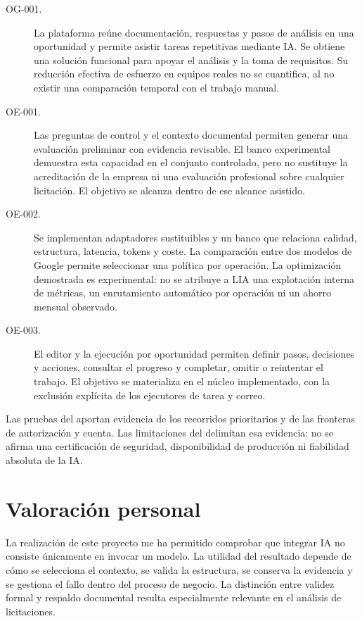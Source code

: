 \begin{description}
  \item[OG-001.] La plataforma reúne documentación, respuestas y
    pasos de análisis en una oportunidad y permite asistir tareas repetitivas
    mediante IA. Se obtiene una solución funcional para apoyar el análisis y la
    toma de requisitos. Su reducción efectiva de esfuerzo en equipos reales no
    se cuantifica, al no existir una comparación temporal con el trabajo manual.

  \item[OE-001.] Las preguntas de control y el contexto
    documental permiten generar una evaluación preliminar con evidencia
    revisable. El banco experimental demuestra esta capacidad en el conjunto
    controlado, pero no sustituye la acreditación de la empresa ni una evaluación
    profesional sobre cualquier licitación. El objetivo se alcanza dentro de ese
    alcance asistido.

  \item[OE-002.] Se implementan adaptadores sustituibles y un
    banco que relaciona calidad, estructura, latencia, tokens y coste. La
    comparación entre dos modelos de Google permite seleccionar una política por
    operación. La optimización demostrada es experimental: no se atribuye a LIA
    una explotación interna de métricas, un enrutamiento automático por operación
    ni un ahorro mensual observado.

  \item[OE-003.] El editor y la ejecución por oportunidad permiten
    definir pasos, decisiones y acciones, consultar el progreso y completar,
    omitir o reintentar el trabajo. El objetivo se materializa en el núcleo
    implementado, con la exclusión explícita de los ejecutores de tarea y correo.
\end{description}

Las pruebas del  aportan evidencia de los recorridos
prioritarios y de las fronteras de autorización y cuenta. Las limitaciones del
 delimitan esa evidencia: no se afirma una certificación
de seguridad, disponibilidad de producción ni fiabilidad absoluta de la IA.

\section{Valoración personal}

La realización de este proyecto me ha permitido comprobar que integrar IA no
consiste únicamente en invocar un modelo. La utilidad del resultado depende de
cómo se selecciona el contexto, se valida la estructura, se conserva la
evidencia y se gestiona el fallo dentro del proceso de negocio. La distinción
entre validez formal y respaldo documental resulta especialmente relevante en
el análisis de licitaciones.

